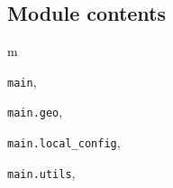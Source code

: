 \documentclass[letterpaper,10pt,english]{sphinxmanual}
\begin{document}

\begin{fulllineitems}
\label{main:main.utils.save_plot}
\end{fulllineitems}



\subsection{Module contents}
\label{main:module-main}\label{main:module-contents}

\renewcommand{\indexname}{Python Module Index}
\begin{theindex}
\def\bigletter#1{{\Large\sffamily#1}\nopagebreak\vspace{1mm}}
\bigletter{m}
\item {\texttt{main}}, \pageref{main:module-main}
\item {\texttt{main.geo}}, \pageref{main:module-main.geo}
\item {\texttt{main.local\_config}}, \pageref{main:module-main.local_config}
\item {\texttt{main.utils}}, \pageref{main:module-main.utils}
\end{theindex}

\renewcommand{\indexname}{Index}
\printindex
\end{document}
